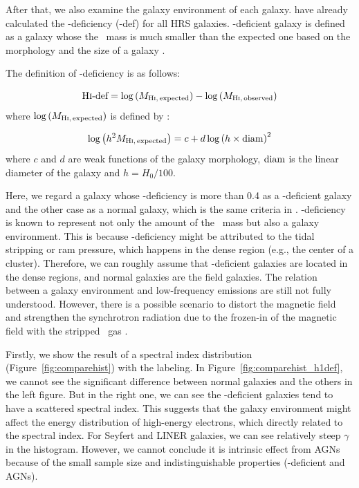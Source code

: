 After that, we also examine the galaxy environment of each galaxy.
\citet{Boselli2014} have already calculated the \nh-deficiency (\nh-def) for all HRS galaxies.
\nh-deficient galaxy is defined as a galaxy whose the \nh~mass is much smaller than the expected one based on the morphology and the size of a galaxy \citep{Haynes1984, Boselli2009}.

The definition of \nh-deficiency is as follows:

\begin{equation}\label{eq:definitionofHIdeficiency}
    \text{H\textsc{i}-def} = \log\left(M_{\mathrm{H\textsc{i},\,expected}}\right) - \log\left(M_{\mathrm{H\textsc{i},\,observed}}\right)
\end{equation}
where $\log\left(M_{\mathrm{H\textsc{i},\,expected}}\right)$ is defined by \citet{Haynes1984}:

\begin{equation}\label{eq:definitionofexpectedHIdef}
    \log\left(h^2 M_{\mathrm{H\textsc{i},\,expected}}\right) = c + d\log\left(h\times\mathrm{diam}\right)^2
\end{equation}
where $c$ and $d$ are weak functions of the galaxy morphology, $\mathrm{diam}$ is the linear diameter of the galaxy and $h=H_0 / 100$.

Here, we regard a galaxy whose \nh-deficiency is more than 0.4 as a \nh-deficient galaxy and the other case as a normal galaxy, which is the same criteria in \citet{Ciesla2016}.
\nh-deficiency is known to represent not only the amount of the \nh~mass but also a galaxy environment.
This is because \nh-deficiency might be attributed to the tidal stripping or ram pressure, which happens in the dense region (e.g., the center of a cluster).
Therefore, we can roughly assume that \nh-deficient galaxies are located in the dense regions, and normal galaxies are the field galaxies.
The relation between a galaxy environment and low-frequency emissions are still not fully understood.
However, there is a possible scenario to distort the magnetic field and strengthen the synchrotron radiation due to the frozen-in of the magnetic field with the stripped \nh~gas \citep{Murphy2009}.

Firstly, we show the result of a spectral index distribution (Figure~\ref{fig:comparehist}) with the labeling.
In Figure~\ref{fig:comparehist_h1def}, we cannot see the significant difference between normal galaxies and the others in the left figure.
But in the right one, we can see the \nh-deficient galaxies tend to have a scattered spectral index.
This suggests that the galaxy environment might affect the energy distribution of high-energy electrons, which directly related to the spectral index.
For Seyfert and LINER galaxies, we can see relatively steep $\gamma$ in the histogram.
However, we cannot conclude it is intrinsic effect from AGNs because of the small sample size and indistinguishable properties (\nh-deficient and AGNs).

